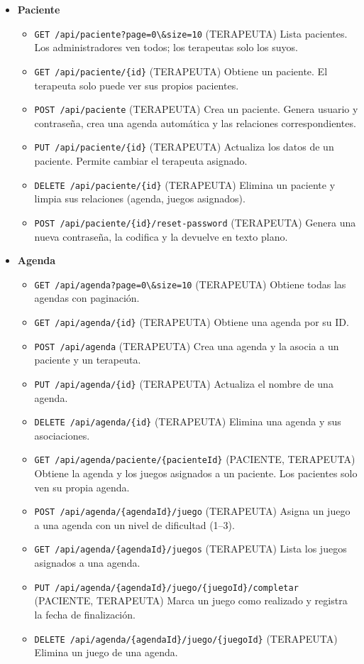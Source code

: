 \begin{itemize}
\item \textbf{Paciente}
\begin{itemize}
\item \verb|GET /api/paciente?page=0\&size=10| (TERAPEUTA) Lista pacientes. Los administradores ven todos; los terapeutas solo los suyos.
\item \verb|GET /api/paciente/{id}| (TERAPEUTA) Obtiene un paciente. El terapeuta solo puede ver sus propios pacientes.
\item \verb|POST /api/paciente| (TERAPEUTA) Crea un paciente. Genera usuario y contraseña, crea una agenda automática y las relaciones correspondientes.
\item \verb|PUT /api/paciente/{id}| (TERAPEUTA) Actualiza los datos de un paciente. Permite cambiar el terapeuta asignado.
\item \verb|DELETE /api/paciente/{id}| (TERAPEUTA) Elimina un paciente y limpia sus relaciones (agenda, juegos asignados).
\item \verb|POST /api/paciente/{id}/reset-password| (TERAPEUTA) Genera una nueva contraseña, la codifica y la devuelve en texto plano.
\end{itemize}

\item \textbf{Agenda}
\begin{itemize}
\item \verb|GET /api/agenda?page=0\&size=10| (TERAPEUTA) Obtiene todas las agendas con paginación.
\item \verb|GET /api/agenda/{id}| (TERAPEUTA) Obtiene una agenda por su ID.
\item \verb|POST /api/agenda| (TERAPEUTA) Crea una agenda y la asocia a un paciente y un terapeuta.
\item \verb|PUT /api/agenda/{id}| (TERAPEUTA) Actualiza el nombre de una agenda.
\item \verb|DELETE /api/agenda/{id}| (TERAPEUTA) Elimina una agenda y sus asociaciones.
\item \verb|GET /api/agenda/paciente/{pacienteId}| (PACIENTE, TERAPEUTA) Obtiene la agenda y los juegos asignados a un paciente. Los pacientes solo ven su propia agenda.
\item \verb|POST /api/agenda/{agendaId}/juego| (TERAPEUTA) Asigna un juego a una agenda con un nivel de dificultad (1--3).
\item \verb|GET /api/agenda/{agendaId}/juegos| (TERAPEUTA) Lista los juegos asignados a una agenda.
\item \verb|PUT /api/agenda/{agendaId}/juego/{juegoId}/completar| (PACIENTE, TERAPEUTA) Marca un juego como realizado y registra la fecha de finalización.
\item \verb|DELETE /api/agenda/{agendaId}/juego/{juegoId}| (TERAPEUTA) Elimina un juego de una agenda.
\end{itemize}


\end{itemize}

